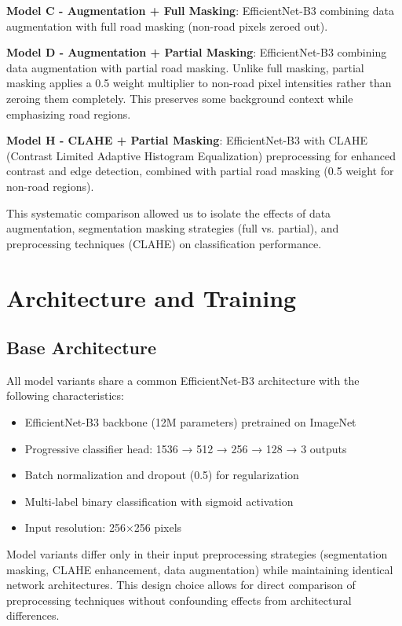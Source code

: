 \documentclass[12pt]{article}
\begin{document}
\textbf{Model C - Augmentation + Full Masking}: EfficientNet-B3 combining data augmentation with full road masking (non-road pixels zeroed out).

\textbf{Model D - Augmentation + Partial Masking}: EfficientNet-B3 combining data augmentation with partial road masking. Unlike full masking, partial masking applies a 0.5 weight multiplier to non-road pixel intensities rather than zeroing them completely. This preserves some background context while emphasizing road regions.

\textbf{Model H - CLAHE + Partial Masking}: EfficientNet-B3 with CLAHE (Contrast Limited Adaptive Histogram Equalization) preprocessing for enhanced contrast and edge detection, combined with partial road masking (0.5 weight for non-road regions).

This systematic comparison allowed us to isolate the effects of data augmentation, segmentation masking strategies (full vs. partial), and preprocessing techniques (CLAHE) on classification performance.

\section{Architecture and Training}

\subsection{Base Architecture}

All model variants share a common EfficientNet-B3 architecture with the following characteristics:

\begin{itemize}[itemsep=1pt,parsep=0pt,topsep=2pt]
\item EfficientNet-B3 backbone (12M parameters) pretrained on ImageNet
\item Progressive classifier head: 1536 → 512 → 256 → 128 → 3 outputs
\item Batch normalization and dropout (0.5) for regularization
\item Multi-label binary classification with sigmoid activation
\item Input resolution: 256×256 pixels
\end{itemize}

Model variants differ only in their input preprocessing strategies (segmentation masking, CLAHE enhancement, data augmentation) while maintaining identical network architectures. This design choice allows for direct comparison of preprocessing techniques without confounding effects from architectural differences.
\end{document}
